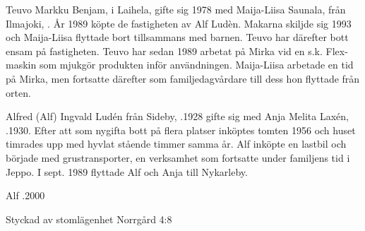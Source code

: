 
Teuvo Markku Benjam,  i Laihela, gifte sig 1978 med Maija-Liisa Saunala, från Ilmajoki, . År 1989 köpte de fastigheten av Alf Ludèn. Makarna skiljde sig 1993 och Maija-Liisa flyttade bort tillsammans med barnen. Teuvo har därefter bott ensam på fastigheten. Teuvo har sedan 1989 arbetat på Mirka vid en s.k. Flex-maskin som mjukgör produkten inför användningen. Maija-Liisa arbetade en tid på Mirka, men fortsatte därefter som familjedagvårdare till dess hon flyttade från orten.
\begin{jhchildren}
  \item {}
  \item {}
  \item {}
  \item {}
\end{jhchildren}


Alfred (Alf) Ingvald Ludén från Sideby, .1928 gifte sig med Anja Melita Laxén, .1930. Efter att som nygifta bott på flera platser inköptes tomten 1956 och huset timrades upp med hyvlat stående timmer samma år. Alf inköpte en lastbil och började med grustransporter, en verksamhet som fortsatte under familjens tid i Jeppo. I sept. 1989 flyttade Alf och Anja till Nykarleby.
\begin{jhchildren}
  \item {}
  \item {}
\end{jhchildren}
Alf .2000




Styckad av stomlägenhet Norrgård 4:8



